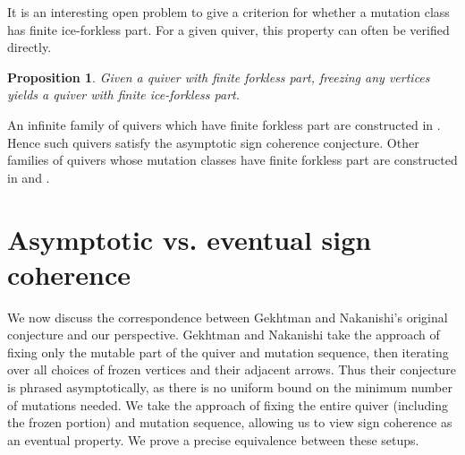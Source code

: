 \documentclass[12pt]{amsart}
\newcommand{\cS}[1]{{\noindent\textsf{\color{purple}$\blacksquare$~#1~$\blacksquare$}}}
\newtheorem{prop}[thm]{Proposition}
\theoremstyle{definition}
\theoremstyle{remark}
\numberwithin{equation}{section}
\begin{document}
It is an interesting open problem to give a criterion for whether a mutation class has finite ice-forkless part.  For a given quiver, this property can often be verified directly. 

\begin{prop}
    Given a quiver with finite forkless part, freezing any vertices yields a quiver with finite ice-forkless part.  
\end{prop}
An infinite family of quivers which have finite forkless part are constructed in \cite[Example 5.13]{COQ}. 
Hence such quivers satisfy the asymptotic sign coherence conjecture.  Other families of quivers whose mutation classes have finite forkless part are constructed in \cite[Examples 10.1-10.2]{LMC} and \cite{FordyMarsh}.



\section{Asymptotic vs. eventual sign coherence}
\label{sec:asym vs eventual}
We now discuss the correspondence between Gekhtman and Nakanishi's original conjecture and our perspective.  Gekhtman and Nakanishi take the approach of fixing only the mutable part of the quiver and mutation sequence, then iterating over all choices of frozen vertices and their adjacent arrows.  Thus their conjecture is phrased asymptotically, as there is no uniform bound on the minimum number of mutations needed.  We take the approach of fixing the entire quiver (including the frozen portion) and mutation sequence, allowing us to view sign coherence as an eventual property.  We prove a precise equivalence between these setups.  


\end{document}

